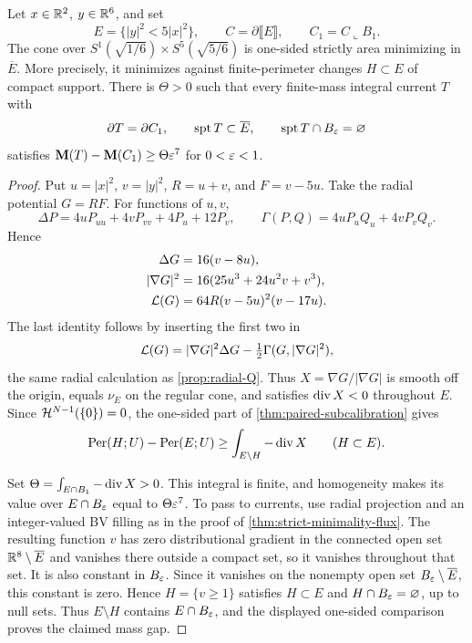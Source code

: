 \begin{corollary}
\label{cor:Lin-one-sided}
Let \(x\in\mathbb R^2\), \(y\in\mathbb R^6\), and set
\[
 E=\{|y|^2<5|x|^2\},\qquad C=\partial\llbracket E\rrbracket,
 \qquad C_1=C\llcorner B_1.
\]
The cone over
\(S^1(\sqrt{1/6})\times S^5(\sqrt{5/6})\) is one-sided strictly
area minimizing in \(\overline E\).
More precisely, it minimizes against finite-perimeter changes
\(H\subset E\) of compact support.  There is \(\Theta>0\) such that
every finite-mass integral current \(T\) with
\[
 \partial T=\partial C_1,\qquad
 \operatorname{spt}T\subset\overline E,\qquad
 \operatorname{spt}T\cap B_\varepsilon=\varnothing
\]
satisfies \(\mathbf M(T)-\mathbf M(C_1)\geq\Theta\varepsilon^7\)
for \(0<\varepsilon<1\).
\end{corollary}

\begin{proof}
Put \(u=|x|^2\), \(v=|y|^2\), \(R=u+v\), and \(F=v-5u\).
Take the radial potential \(G=RF\).  For functions of \(u,v\),
\[
 \Delta P=4uP_{uu}+4vP_{vv}+4P_u+12P_v,\qquad
 \Gamma(P,Q)=4uP_uQ_u+4vP_vQ_v.
\]
Hence
\begin{align*}
 \Delta G&=16(v-8u),\\
 |\nabla G|^2&=16(25u^3+24u^2v+v^3),\\
 \mathcal L(G)&=64R(v-5u)^2(v-17u).
\end{align*}
The last identity follows by inserting the first two in
\[
 \mathcal L(G)=|\nabla G|^2\Delta G-
 \tfrac12\Gamma(G,|\nabla G|^2),
\]
the same radial calculation as
\cref{prop:radial-Q}.
Thus \(X=\nabla G/|\nabla G|\) is smooth off the origin,
equals \(\nu_E\) on the regular cone, and satisfies
\(\operatorname{div} X<0\) throughout \(E\).
Since \(\mathcal H^{N-1}(\{0\})=0\), the one-sided part of
\cref{thm:paired-subcalibration} gives
\[
 \operatorname{Per}(H;U)-\operatorname{Per}(E;U)
 \geq\int_{E\setminus H}-\operatorname{div} X\qquad(H\subset E).
\]

Set \(\Theta=\int_{E\cap B_1}-\operatorname{div} X>0\).
This integral is finite, and homogeneity makes its value over
\(E\cap B_\varepsilon\) equal to \(\Theta\varepsilon^7\).
To pass to currents, use radial projection and an integer-valued BV
filling as in the proof of \cref{thm:strict-minimality-flux}.
The resulting function \(v\) has zero distributional gradient in
the connected open set \(\mathbb R^8\setminus\overline E\) and vanishes
there outside a compact set, so it vanishes throughout that set.
It is also constant in \(B_\varepsilon\). Since it vanishes on the
nonempty open set \(B_\varepsilon\setminus\overline E\), this constant
is zero. Hence \(H=\{v\geq1\}\) satisfies \(H\subset E\) and
\(H\cap B_\varepsilon=\varnothing\), up to null sets. Thus \(E\setminus H\)
contains \(E\cap B_\varepsilon\), and the displayed one-sided comparison
proves the claimed mass gap.
\end{proof}
